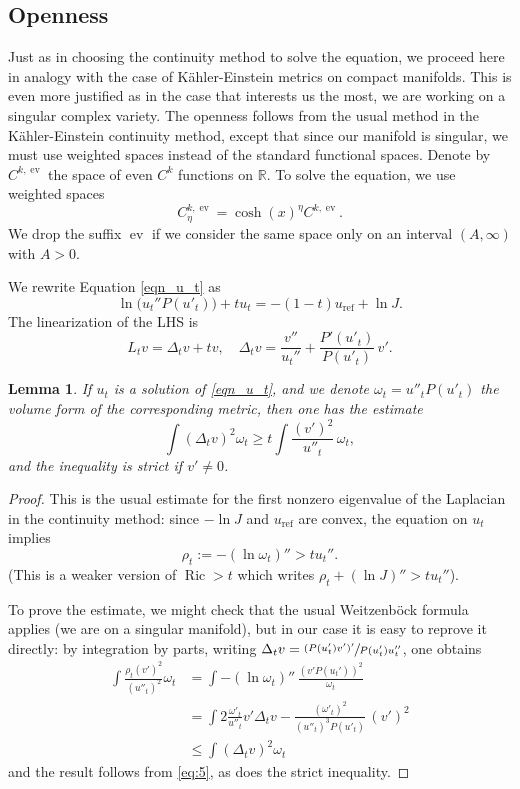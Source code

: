 \documentclass[JEP,XML,SOM,Unicode, NoEqCountersInSection, NoFloatCountersInSection]{cedram}
\theoremstyle{plain}
\newtheorem{lem}[thm]{Lemma}
\theoremstyle{definition}
\DeclareMathOperator{\ev}{ev}
\DeclareMathOperator{\Ric}{Ric}
\begin{document}
\subsection{Openness}
Just as in choosing the continuity method to solve the equation, we proceed here in analogy
with the case of Kähler-Einstein metrics on compact manifolds. This is even more justified
as in the case that interests us the most, we are working on a singular complex variety.
The openness follows from the usual method in the Kähler-Einstein continuity method, except that since our manifold is singular, we must use weighted spaces instead of the standard functional spaces.
Denote by $C^{k,\ev}$ the space of even $C^k$ functions on $\mathbb{R}$. To solve the equation, we use weighted spaces
\begin{equation}
C^{k,\ev}_\eta=\cosh(x)^\eta C^{k,\ev} .
\end{equation}
We drop the suffix $\ev$ if we consider the same space only on an interval $(A,\infty)$ with $A>0$.

We rewrite Equation \eqref{eqn_u_t} as
\begin{equation}
\label{eq:3}
\ln \big( u_t''P(u'_t) \big) + t u_t = -(1-t)u_{\mathrm{ref}} + \ln J.
\end{equation}
The linearization of the LHS is
\begin{equation}
L_tv = \Delta_tv + t v, \quad \Delta_tv = \frac{v''}{u_t''} + \frac{P'(u'_t)}{P(u'_t)}\, v' .
\end{equation}

\begin{lem}\label{lem:vp-D}
If $u_t$ is a solution of \eqref{eqn_u_t}, and we denote $\omega_t=u''_t P(u'_t)$ the volume form of the corresponding metric, then one has the estimate
\[ \int (\Delta_tv)^2 \omega_t \geq t \int \frac{(v')^2}{u''_t}\, \omega_t, \]
and the inequality is strict if $v'\neq0$.
\end{lem}
\begin{proof}
This is the usual estimate for the first nonzero eigenvalue of the Laplacian in the continuity method: since $-\ln J$ and $u_{\mathrm{ref}}$ are convex, the equation on $u_t$ implies
\begin{equation}
\rho_t := -(\ln \omega_t)'' > t u_t''.\label{eq:5}
\end{equation}
(This is a weaker version of $\Ric> t$ which writes $\rho_t+(\ln J)''>t u_t''$).

To prove the estimate, we might check that the usual Weitzenböck formula applies (we are on a singular manifold), but in our case it is easy to reprove it directly: by integration by parts, writing $\Delta_tv=\sfrac{(P(u_t')v')'}{P(u_t')u_t''}$, one obtains
\begin{align*}
\int \frac{\rho_t(v')^2}{(u''_t)^2} \omega_t
& = \int -(\ln \omega_t)''\, \frac{(v' P(u_t'))^2}{\omega_t} \\
& = \int 2 \frac{\omega'_t}{u''_t} v' \Delta_tv - \frac{(\omega'_t)^2}{(u''_t)^3P(u'_t)}\, (v')^2 \\
& \leq \int (\Delta_tv)^2 \omega_t
\end{align*}
and the result follows from \eqref{eq:5}, as does the strict inequality.
\end{proof}
\end{document}
